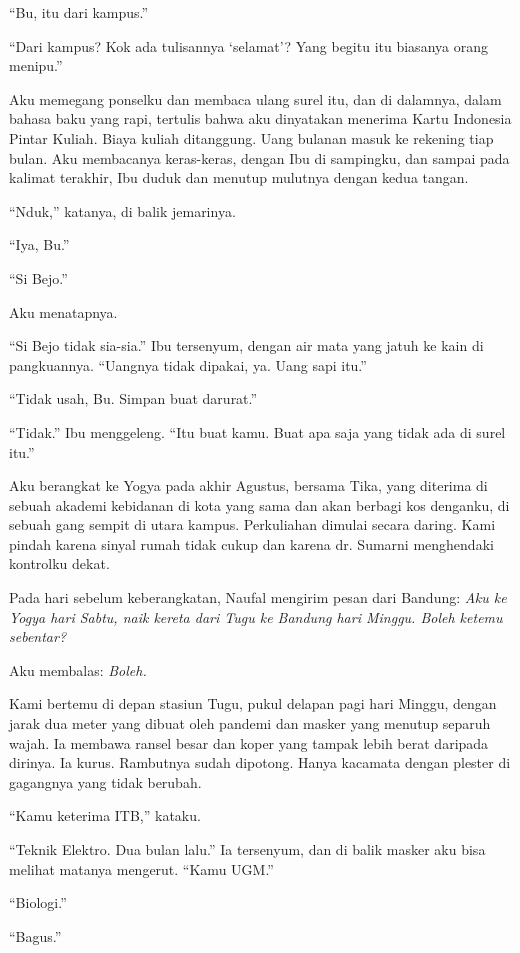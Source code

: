 \documentclass[11pt,twoside,openany]{book}
\makeatletter
\newcommand{\scenebreak}{\par\vspace{0.9em}{\centering\textsc{*\hspace{0.7em}*\hspace{0.7em}*}\par}\vspace{0.9em}\@afterindentfalse\@afterheading}
\makeatother
\begin{document}
``Bu, itu dari kampus.''

``Dari kampus? Kok ada tulisannya `selamat'? Yang begitu itu biasanya orang menipu.''

Aku memegang ponselku dan membaca ulang surel itu, dan di dalamnya, dalam bahasa baku yang rapi, tertulis bahwa aku dinyatakan menerima Kartu Indonesia Pintar Kuliah. Biaya kuliah ditanggung. Uang bulanan masuk ke rekening tiap bulan. Aku membacanya keras-keras, dengan Ibu di sampingku, dan sampai pada kalimat terakhir, Ibu duduk dan menutup mulutnya dengan kedua tangan.

``Nduk,'' katanya, di balik jemarinya.

``Iya, Bu.''

``Si Bejo.''

Aku menatapnya.

``Si Bejo tidak sia-sia.'' Ibu tersenyum, dengan air mata yang jatuh ke kain di pangkuannya. ``Uangnya tidak dipakai, ya. Uang sapi itu.''

``Tidak usah, Bu. Simpan buat darurat.''

``Tidak.'' Ibu menggeleng. ``Itu buat kamu. Buat apa saja yang tidak ada di surel itu.''

\scenebreak
Aku berangkat ke Yogya pada akhir Agustus, bersama Tika, yang diterima di sebuah akademi kebidanan di kota yang sama dan akan berbagi kos denganku, di sebuah gang sempit di utara kampus. Perkuliahan dimulai secara daring. Kami pindah karena sinyal rumah tidak cukup dan karena dr. Sumarni menghendaki kontrolku dekat.

Pada hari sebelum keberangkatan, Naufal mengirim pesan dari Bandung: \emph{Aku ke Yogya hari Sabtu, naik kereta dari Tugu ke Bandung hari Minggu. Boleh ketemu sebentar?}

Aku membalas: \emph{Boleh.}

Kami bertemu di depan stasiun Tugu, pukul delapan pagi hari Minggu, dengan jarak dua meter yang dibuat oleh pandemi dan masker yang menutup separuh wajah. Ia membawa ransel besar dan koper yang tampak lebih berat daripada dirinya. Ia kurus. Rambutnya sudah dipotong. Hanya kacamata dengan plester di gagangnya yang tidak berubah.

``Kamu keterima ITB,'' kataku.

``Teknik Elektro. Dua bulan lalu.'' Ia tersenyum, dan di balik masker aku bisa melihat matanya mengerut. ``Kamu UGM.''

``Biologi.''

``Bagus.''
\end{document}
